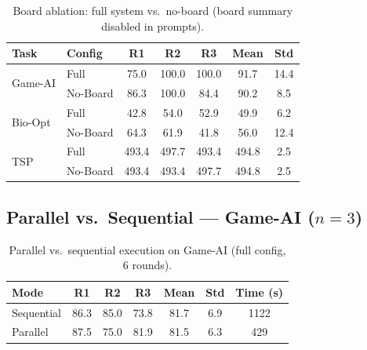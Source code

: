 \documentclass{article}
\begin{document}
\begin{table}[h]
\centering
\caption{Board ablation: full system vs.\ no-board (board summary disabled in prompts).}
\label{tab:board_runs}
\small
\begin{tabular}{@{}llccc|cc@{}}
\toprule
\textbf{Task} & \textbf{Config} & \textbf{R1} & \textbf{R2} & \textbf{R3} & \textbf{Mean} & \textbf{Std} \\
\midrule
\multirow{2}{*}{Game-AI}
  & Full     & 75.0  & 100.0 & 100.0 & 91.7  & 14.4 \\
  & No-Board & 86.3  & 100.0 & 84.4  & 90.2  & 8.5  \\
\midrule
\multirow{2}{*}{Bio-Opt}
  & Full     & 42.8  & 54.0  & 52.9  & 49.9  & 6.2  \\
  & No-Board & 64.3  & 61.9  & 41.8  & 56.0  & 12.4 \\
\midrule
\multirow{2}{*}{TSP}
  & Full     & 493.4 & 497.7 & 493.4 & 494.8 & 2.5  \\
  & No-Board & 493.4 & 493.4 & 497.7 & 494.8 & 2.5  \\
\bottomrule
\end{tabular}
\end{table}

\subsection{Parallel vs.\ Sequential --- Game-AI ($n{=}3$)}

\begin{table}[h]
\centering
\caption{Parallel vs.\ sequential execution on Game-AI (full config, 6 rounds).}
\label{tab:parallel_runs}
\small
\begin{tabular}{@{}lccc|ccc@{}}
\toprule
\textbf{Mode} & \textbf{R1} & \textbf{R2} & \textbf{R3} & \textbf{Mean} & \textbf{Std} & \textbf{Time (s)} \\
\midrule
Sequential & 86.3  & 85.0  & 73.8  & 81.7  & 6.9  & 1122 \\
Parallel   & 87.5  & 75.0  & 81.9  & 81.5  & 6.3  & 429  \\
\bottomrule
\end{tabular}
\end{table}
\end{document}
